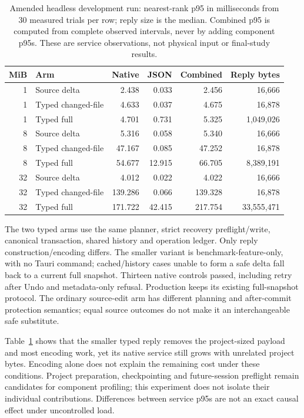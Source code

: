 \begin{table}[htbp]
\small\centering
\begin{tabular}{@{}rlrrrr@{}}
\toprule
MiB & Arm & Native & JSON & Combined & Reply bytes\\
\midrule
1 & Source delta & 2.438 & 0.033 & 2.456 & 16,666\\
1 & Typed changed-file & 4.633 & 0.037 & 4.675 & 16,878\\
1 & Typed full & 4.701 & 0.731 & 5.325 & 1,049,026\\
8 & Source delta & 5.316 & 0.058 & 5.340 & 16,666\\
8 & Typed changed-file & 47.167 & 0.085 & 47.252 & 16,878\\
8 & Typed full & 54.677 & 12.915 & 66.705 & 8,389,191\\
32 & Source delta & 4.012 & 0.022 & 4.022 & 16,666\\
32 & Typed changed-file & 139.286 & 0.066 & 139.328 & 16,878\\
32 & Typed full & 171.722 & 42.415 & 217.754 & 33,555,471\\
\bottomrule
\end{tabular}
\caption{Amended headless development run: nearest-rank p95 in milliseconds
from 30 measured trials per row; reply size is the median. Combined p95 is
computed from complete observed intervals, never by adding component p95s.
These are service observations, not physical input or final-study results.}
\label{tab:source-cost}
\end{table}

The two typed arms use the same planner, strict recovery preflight/write,
canonical transaction, shared history and operation ledger. Only reply
construction/encoding differs. The smaller variant is benchmark-feature-only,
with no Tauri command; cached/history cases unable to form a safe delta fall
back to a current full snapshot. Thirteen native controls passed, including
retry after Undo and metadata-only refusal. Production keeps its existing
full-snapshot protocol. The ordinary source-edit arm has different planning
and after-commit protection semantics; equal source outcomes do not make it
an interchangeable safe substitute.

Table~\ref{tab:source-cost} shows that the smaller typed reply removes the
project-sized payload and most encoding work, yet its native service still
grows with unrelated project bytes. Encoding alone does not explain the
remaining cost under these conditions. Project preparation, checkpointing
and future-session preflight remain candidates for component profiling;
this experiment does not isolate their individual contributions. Differences
between service p95s are not an exact causal effect under uncontrolled load.

